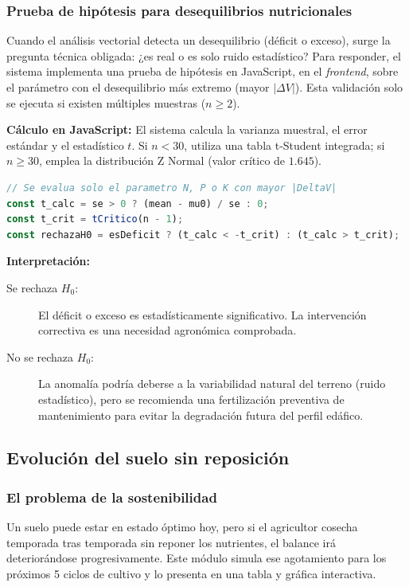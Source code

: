 \documentclass[12pt]{article}
\begin{document}
\subsubsection{Prueba de hipótesis para desequilibrios nutricionales}
Cuando el análisis vectorial detecta un desequilibrio (déficit o exceso), surge la pregunta técnica obligada: ¿es real o es solo ruido estadístico? Para responder, el sistema implementa una prueba de hipótesis en JavaScript, en el \textit{frontend}, sobre el parámetro con el desequilibrio más extremo (mayor $|\Delta V|$). Esta validación solo se ejecuta si existen múltiples muestras ($n \ge 2$).

\noindent\textbf{Cálculo en JavaScript:} El sistema calcula la varianza muestral, el error estándar y el estadístico $t$. Si $n < 30$, utiliza una tabla t-Student integrada; si $n \ge 30$, emplea la distribución Z Normal (valor crítico de $1.645$).

\begin{lstlisting}[language=JavaScript]
// Se evalua solo el parametro N, P o K con mayor |DeltaV|
const t_calc = se > 0 ? (mean - mu0) / se : 0;
const t_crit = tCritico(n - 1);
const rechazaH0 = esDeficit ? (t_calc < -t_crit) : (t_calc > t_crit);
\end{lstlisting}

\noindent\textbf{Interpretación:}

\begin{description}
    \item[Se rechaza $H_0$:] El déficit o exceso es estadísticamente significativo. La intervención correctiva es una necesidad agronómica comprobada.
    \item[No se rechaza $H_0$:] La anomalía podría deberse a la variabilidad natural del terreno (ruido estadístico), pero se recomienda una fertilización preventiva de mantenimiento para evitar la degradación futura del perfil edáfico.
\end{description}

\subsection{Evolución del suelo sin reposición}

\subsubsection{El problema de la sostenibilidad}
Un suelo puede estar en estado óptimo hoy, pero si el agricultor cosecha temporada tras temporada sin reponer los nutrientes, el balance irá deteriorándose progresivamente. Este módulo simula ese agotamiento para los próximos 5 ciclos de cultivo y lo presenta en una tabla y gráfica interactiva.
\end{document}
